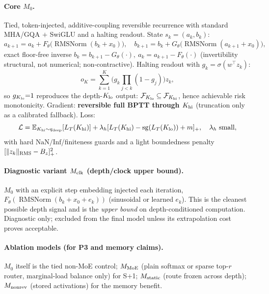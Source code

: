 \documentclass[11pt]{article}
\newcommand{\sg}{\operatorname{sg}}\newcommand{\RMSNorm}{\operatorname{RMSNorm}}
\begin{document}
\paragraph{Core $M_0$.} Tied, token-injected, additive-coupling reversible recurrence with standard MHA/GQA $+$ SwiGLU and a halting readout. State $s_k=(a_k,b_k)$:
\begin{equation}
a_{k+1}=a_k+F_\theta\!\big(\RMSNorm(b_k+x_0)\big),\quad
b_{k+1}=b_k+G_\theta\!\big(\RMSNorm(a_{k+1}+x_0)\big),
\end{equation}
exact floor-free inverse $b_k=b_{k+1}-G_\theta(\cdot),\ a_k=a_{k+1}-F_\theta(\cdot)$ (invertibility structural, not numerical; non-contractive). Halting readout with $g_k=\sigma(w^\top z_k)$:
\begin{equation}
o_K=\sum_{k=1}^{K}\Big(g_k\!\!\prod_{j<k}(1-g_j)\Big)z_k,
\end{equation}
so $g_{K_{\rm lo}}{=}1$ reproduces the depth-$K_{\rm lo}$ output: $\mathcal F_{K_{\rm lo}}\subseteq\mathcal F_{K_{\rm hi}}$, hence achievable risk monotonicity. Gradient: \textbf{reversible full BPTT through $K_{\rm hi}$} (truncation only as a calibrated fallback). Loss:
\begin{equation}
\mathcal L=\E_{K_{\rm hi}\sim q_{\rm deep}}[L_T(K_{\rm hi})]+\lambda_h[L_T(K_{\rm hi})-\sg(L_T(K_{\rm lo}))+m]_+,\quad\lambda_h\ \text{small},
\end{equation}
with hard $\mathrm{NaN}/\mathrm{Inf}$/finiteness guards and a light boundedness penalty $[\|z_k\|_{\rm RMS}-B_z]_+^2$.

\paragraph{Diagnostic variant $M_{\rm clk}$ (depth/clock upper bound).} $M_0$ with an explicit step embedding injected each iteration, $F_\theta(\RMSNorm(b_k+x_0+e_k))$ (sinusoidal or learned $e_k$). This is the cleanest possible depth signal and is the \emph{upper bound} on depth-conditioned computation. Diagnostic only; excluded from the final model unless its extrapolation cost proves acceptable.

\paragraph{Ablation models (for P3 and memory claims).} $M_0$ itself is the tied non-MoE control; $M_{\rm MoE}$ (plain softmax or sparse top-$r$ router, marginal-load balance only) for S$+$1; $M_{\rm static}$ (route frozen across depth); $M_{\rm nonrev}$ (stored activations) for the memory benefit.
\end{document}
